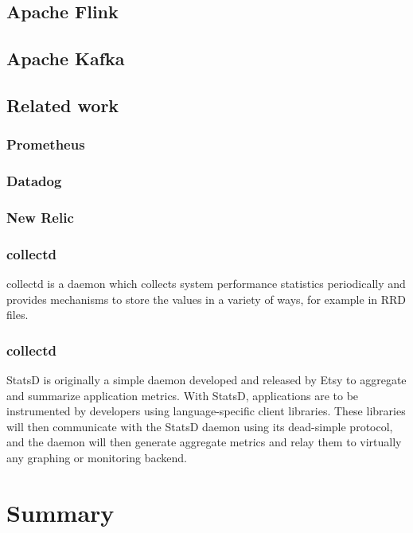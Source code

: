 \subsection{Apache Flink}

\subsection{Apache Kafka}

\subsection{Related work}

\subsubsection{Prometheus}

\subsubsection{Datadog}

\subsubsection{New Relic}

\subsubsection{collectd}

collectd is a daemon which collects system performance statistics periodically and
provides mechanisms to store the values in a variety of ways, for example in RRD files.

\subsubsection{collectd}

StatsD is originally a simple daemon developed and  released by Etsy  to aggregate and summarize application metrics.
With StatsD, applications are to be instrumented by developers using language-specific client libraries. These libraries
will then communicate with the StatsD daemon using its dead-simple protocol, and the daemon will then generate aggregate
metrics and relay them to virtually any graphing or monitoring backend.

\section{Summary}